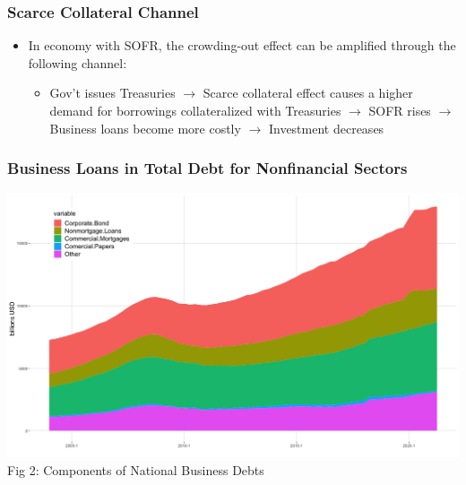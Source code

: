 \documentclass[10pt]{beamer}
\begin{document}
\begin{frame}
\frametitle{Scarce Collateral Channel}
\begin{itemize}
\item In economy with SOFR,  the crowding-out effect can be amplified through the following channel:
\begin{itemize}
\item Gov't issues Treasuries $\xrightarrow {\text{}}$ Scarce collateral effect causes a higher demand for borrowings collateralized with Treasuries $\xrightarrow {\text{}}$ SOFR rises $\xrightarrow {\text{}}$ Business loans become more costly $\xrightarrow{\text{}}$ Investment decreases
\end{itemize}
\end{itemize}
\end{frame}



\begin{frame}
  \frametitle{\large Business Loans in Total Debt for Nonfinancial Sectors}
  \begin{center}
  \includegraphics[scale=.22]{businessdebt.png}\\
  \tiny Fig 2: Components of National Business Debts
  \end{center}
\end{frame}
\end{document}
